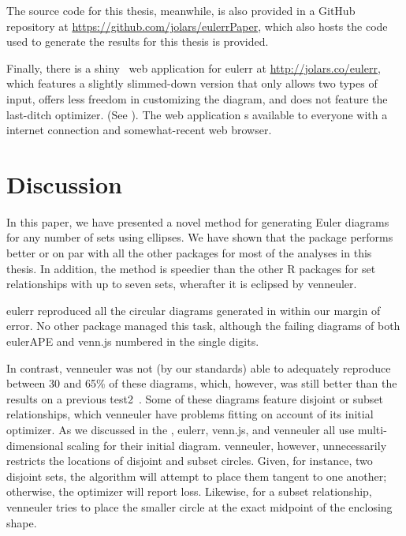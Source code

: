 \documentclass[
  oneside,
  openany,
  numbers=noendperiod,
  parskip=half,
  bibliography=totoc
]{scrbook}\usepackage[]{graphicx}\usepackage{xcolor}
\newcommand{\pkg}[1]{{\fontseries{b}\selectfont #1}}
\begin{document}
The source code for this thesis, meanwhile, is also provided in a GitHub
repository at
\url{https://github.com/jolars/eulerrPaper},
which also hosts the code used to generate the results for this thesis is
provided.

Finally, there is a \pkg{shiny}~\citep{Chang_2017} web application for
\pkg{eulerr} at \url{http://jolars.co/eulerr}, which features
a slightly slimmed-down version that only
allows two types of input, offers less freedom in customizing the
diagram, and does not feature the last-ditch optimizer.
(See ). The web application
s available to everyone with a internet connection and somewhat-recent web
browser.

\chapter{Discussion}
\label{ch:discussion}

In this paper, we have presented a novel method for generating Euler diagrams
for any number of sets using ellipses. We have shown that the package
performs better or on par with all the other packages for most of the analyses
in this thesis. In addition, the method is
speedier than the other R packages for set relationships with up to seven sets,
wherafter it is eclipsed by \pkg{venneuler}.

\pkg{eulerr} reproduced all the circular diagrams
generated in  within our margin of error.
No other package managed this task, although the failing diagrams of both
\pkg{eulerAPE} and \pkg{venn.js} numbered in the single digits.

In contrast, \pkg{venneuler} was not (by our standards) able to adequately
reproduce between 30 and 65\%
of these  diagrams, which, however, was still better than the results on a previous
test2~\citep{Frederickson_2015b}. Some of these diagrams feature disjoint or subset
relationships, which \pkg{venneuler} have problems fitting on account of its
initial optimizer. As we discussed in the ,
\pkg{eulerr}, \pkg{venn.js}, and \pkg{venneuler} all use multi-dimensional scaling for
their initial diagram. \pkg{venneuler}, however, unnecessarily restricts the
locations of disjoint and subset circles. Given, for instance, two disjoint
sets, the algorithm will attempt to place them tangent to one another; otherwise,
the optimizer will report loss. Likewise, for a subset
relationship, \pkg{venneuler} tries to place the smaller circle at the exact
midpoint of the enclosing shape.
\end{document}
